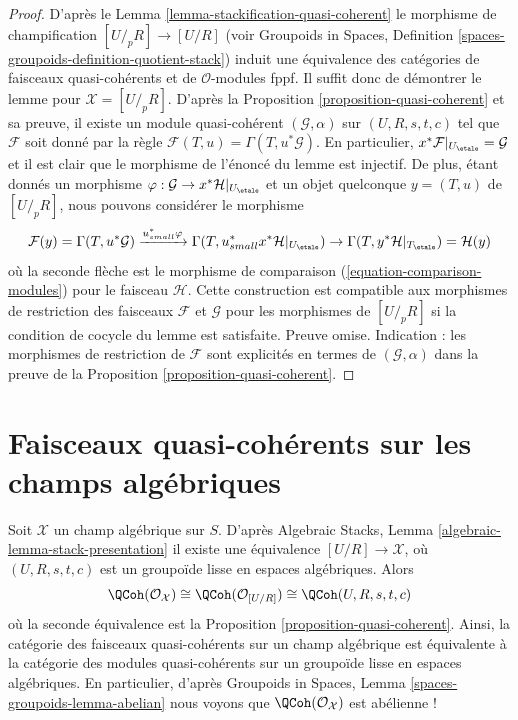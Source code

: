 \begin{proof}
D'après le
Lemma \ref{lemma-stackification-quasi-coherent}
le morphisme de champification $[U/_{\!p}R] \to [U/R]$ (voir
Groupoids in Spaces, Definition
\ref{spaces-groupoids-definition-quotient-stack})
induit une équivalence des catégories de faisceaux quasi-cohérents
et de $\mathcal{O}$-modules fppf.
Il suffit donc de démontrer le lemme pour $\mathcal{X} = [U/_{\!p}R]$.
D'après la Proposition \ref{proposition-quasi-coherent}
et sa preuve, il existe un module quasi-cohérent
$(\mathcal{G}, \alpha)$ sur $(U, R, s, t, c)$ tel que
$\mathcal{F}$ soit donné par la règle
$\mathcal{F}(T, u) = \Gamma(T, u^*\mathcal{G})$.
En particulier, $x^*\mathcal{F}|_{U_\etale} = \mathcal{G}$
et il est clair que le morphisme de l'énoncé du
lemme est injectif. De plus, étant donnés un morphisme
$\varphi : \mathcal{G} \to x^*\mathcal{H}|_{U_\etale}$
et un objet quelconque
$y = (T, u)$ de $[U/_{\!p}R]$, nous pouvons considérer le morphisme
$$
\mathcal{F}(y) = \Gamma(T, u^*\mathcal{G})
\xrightarrow{u_{small}^*\varphi}
\Gamma(T, u_{small}^*x^*\mathcal{H}|_{U_\etale})
\rightarrow
\Gamma(T, y^*\mathcal{H}|_{T_\etale}) = \mathcal{H}(y)
$$
où la seconde flèche est le morphisme de comparaison
(\ref{equation-comparison-modules}) pour le faisceau $\mathcal{H}$.
Cette construction est compatible aux morphismes de restriction des
faisceaux $\mathcal{F}$ et $\mathcal{G}$ pour les morphismes de
$[U/_{\!p}R]$ si la condition de cocycle du
lemme est satisfaite. Preuve omise. Indication : les morphismes de restriction
de $\mathcal{F}$ sont explicités en termes de $(\mathcal{G}, \alpha)$
dans la preuve de la
Proposition \ref{proposition-quasi-coherent}.
\end{proof}







\section{Faisceaux quasi-cohérents sur les champs algébriques}
\label{section-quasi-coherent-algebraic-stacks}

\noindent
Soit $\mathcal{X}$ un champ algébrique sur $S$. D'après
Algebraic Stacks, Lemma \ref{algebraic-lemma-stack-presentation}
il existe une équivalence $[U/R] \to \mathcal{X}$,
où $(U, R, s, t, c)$ est un groupoïde lisse en espaces algébriques.
Alors
$$
\QCoh(\mathcal{O}_\mathcal{X})
\cong
\QCoh(\mathcal{O}_{[U/R]})
\cong
\QCoh(U, R, s, t, c)
$$
où la seconde équivalence est la
Proposition \ref{proposition-quasi-coherent}.
Ainsi, la catégorie des faisceaux quasi-cohérents sur un champ algébrique
est équivalente à la catégorie des modules quasi-cohérents sur un groupoïde
lisse en espaces algébriques. En particulier, d'après
Groupoids in Spaces, Lemma \ref{spaces-groupoids-lemma-abelian}
nous voyons que $\QCoh(\mathcal{O}_\mathcal{X})$ est abélienne !

